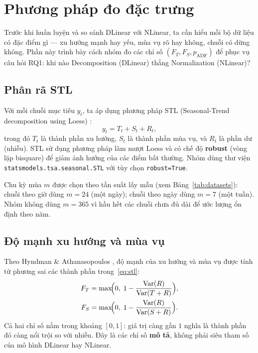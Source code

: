 \section{Phương pháp đo đặc trưng}
\label{sec:methodology}

Trước khi huấn luyện và so sánh DLinear với NLinear, ta cần hiểu mỗi bộ dữ liệu
có đặc điểm gì --- xu hướng mạnh hay yếu, mùa vụ rõ hay không, chuỗi có dừng không.
Phần này trình bày cách nhóm đo các chỉ số \((F_T, F_S, p_{\mathrm{ADF}})\)
để phục vụ câu hỏi RQ1: khi nào Decomposition (DLinear) thắng Normalization (NLinear)?

\subsection{Phân rã STL}

Với mỗi chuỗi mục tiêu \(y_t\), ta áp dụng phương pháp STL
(Seasonal-Trend decomposition using Loess) \cite{cleveland1990stl}:
\begin{equation}
  y_t = T_t + S_t + R_t,
  \label{eq:stl}
\end{equation}
trong đó \(T_t\) là thành phần xu hướng, \(S_t\) là thành phần mùa vụ,
và \(R_t\) là phần dư (nhiễu). STL sử dụng phương pháp làm mượt Loess
và có chế độ \textbf{robust} (vòng lặp bisquare) để giảm ảnh hưởng của các điểm
bất thường. Nhóm dùng thư viện \texttt{statsmodels.tsa.seasonal.STL}
với tùy chọn \texttt{robust=True}.

Chu kỳ mùa \(m\) được chọn theo tần suất lấy mẫu (xem Bảng~\ref{tab:datasets}):
chuỗi theo giờ dùng \(m=24\) (một ngày); chuỗi theo ngày dùng \(m=7\) (một tuần).
Nhóm không dùng \(m=365\) vì hầu hết các chuỗi chưa đủ dài để ước lượng ổn định
theo năm.

\subsection{Độ mạnh xu hướng và mùa vụ}

Theo Hyndman \& Athanasopoulos \cite{hyndman2021fpp3}, độ mạnh của xu hướng
và mùa vụ được tính từ phương sai các thành phần trong~\eqref{eq:stl}:
\begin{align}
  F_T &= \max\!\Bigl(0,\; 1 - \frac{\mathrm{Var}(R)}{\mathrm{Var}(T+R)}\Bigr),
  \label{eq:ft} \\
  F_S &= \max\!\Bigl(0,\; 1 - \frac{\mathrm{Var}(R)}{\mathrm{Var}(S+R)}\Bigr).
  \label{eq:fs}
\end{align}
Cả hai chỉ số nằm trong khoảng \([0,1]\): giá trị càng gần \(1\) nghĩa là
thành phần đó càng nổi trội so với nhiễu. Đây là các chỉ số \textbf{mô tả},
không phải siêu tham số của mô hình DLinear hay NLinear.

